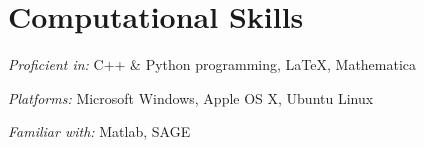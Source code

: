 \documentclass[letterpaper]{article}
\renewenvironment{itemize}{
  \begin{list}{}{
    \setlength{\leftmargin}{1.5em}
  }
}{
  \end{list}
}
\begin{document}
\section*{Computational Skills}

\begin{itemize}
	\item \emph{Proficient in:} C++ \& Python programming, \LaTeX, Mathematica
	\item \emph{Platforms:} Microsoft Windows, Apple OS X, Ubuntu Linux
	\item \emph{Familiar with:} Matlab, SAGE
\end{itemize}

%
\end{document}

